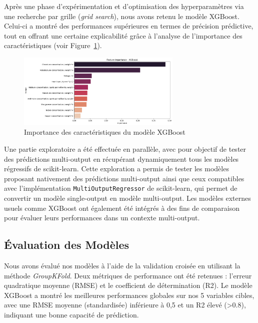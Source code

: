 \documentclass{article}
\begin{document}
Après une phase d’expérimentation et d’optimisation des hyperparamètres via une recherche par grille (\textit{grid search}), nous avons retenu le modèle XGBoost. Celui-ci a montré des performances supérieures en termes de précision prédictive, tout en offrant une certaine explicabilité grâce à l’analyse de l’importance des caractéristiques (voir Figure~\ref{fig:xgboost_feature_importance}).

\begin{figure}[H]
    \centering
    \includegraphics[width=0.7\textwidth]{images/xgboost_feature_importance.png}
    \caption{Importance des caractéristiques du modèle XGBoost}
    \label{fig:xgboost_feature_importance}
\end{figure}

Une partie exploratoire a été effectuée en parallèle, avec pour objectif de tester des prédictions multi-output en récupérant dynamiquement tous les modèles régressifs de scikit-learn. Cette exploration a permis de tester les modèles proposant nativement des prédictions multi-output ainsi que ceux compatibles avec l’implémentation \texttt{MultiOutputRegressor} de scikit-learn, qui permet de convertir un modèle single-output en modèle multi-output. Les modèles externes usuels comme XGBoost ont également été intégrés à des fins de comparaison pour évaluer leurs performances dans un contexte multi-output.

\subsection{Évaluation des Modèles}

Nous avons évalué nos modèles à l’aide de la validation croisée en utilisant la méthode \textit{GroupKFold}. Deux métriques de performance ont été retenues : l’erreur quadratique moyenne (RMSE) et le coefficient de détermination (R2). Le modèle XGBoost a montré les meilleures performances globales sur nos 5 variables cibles, avec une RMSE moyenne (standardisée) inférieure à 0,5 et un R2 élevé (>0.8), indiquant une bonne capacité de prédiction.
\end{document}

